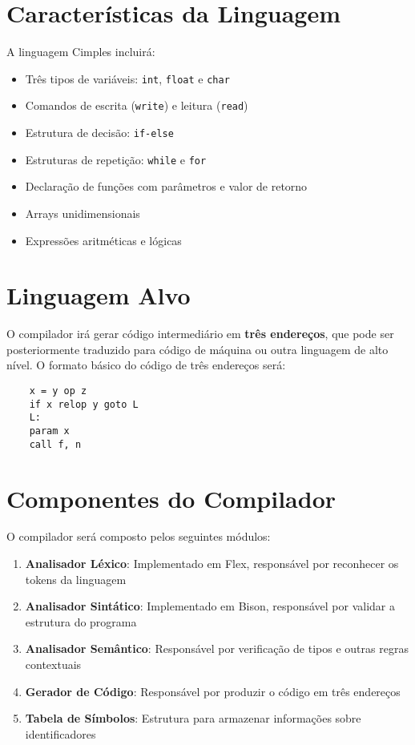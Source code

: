 \documentclass[10pt, a4paper]{article}
\begin{document}
\section{Características da Linguagem}

A linguagem Cimples incluirá:

\begin{itemize}
    \item Três tipos de variáveis: \texttt{int}, \texttt{float} e \texttt{char}
    \item Comandos de escrita (\texttt{write}) e leitura (\texttt{read})
    \item Estrutura de decisão: \texttt{if-else}
    \item Estruturas de repetição: \texttt{while} e \texttt{for}
    \item Declaração de funções com parâmetros e valor de retorno
    \item Arrays unidimensionais
    \item Expressões aritméticas e lógicas
\end{itemize}

\section{Linguagem Alvo}

O compilador irá gerar código intermediário em \textbf{três endereços}, 
que pode ser posteriormente traduzido para código de máquina ou outra 
linguagem de alto nível. O formato básico do código de três endereços será:

\begin{verbatim}
    x = y op z
    if x relop y goto L
    L:
    param x
    call f, n
\end{verbatim}

\section{Componentes do Compilador}

O compilador será composto pelos seguintes módulos:

\begin{enumerate}
    \item \textbf{Analisador Léxico}: 
    Implementado em Flex, responsável por reconhecer os tokens da linguagem
    \item \textbf{Analisador Sintático}: 
    Implementado em Bison, responsável por validar a estrutura do programa
    \item \textbf{Analisador Semântico}: 
    Responsável por verificação de tipos e outras regras contextuais
    \item \textbf{Gerador de Código}: 
    Responsável por produzir o código em três endereços
    \item \textbf{Tabela de Símbolos}: 
    Estrutura para armazenar informações sobre identificadores
\end{enumerate}
\end{document}
